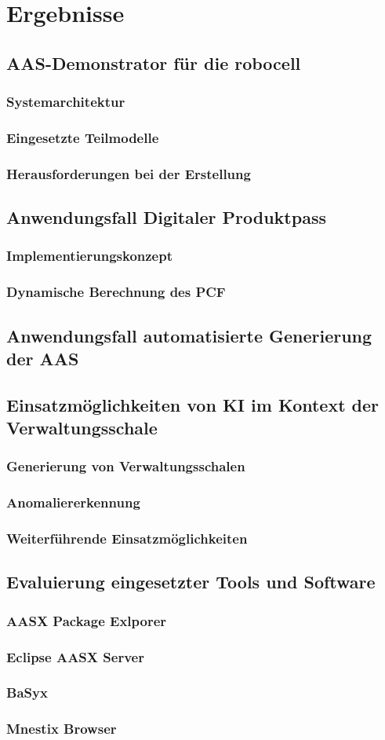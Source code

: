 \section{Ergebnisse}
\subsection{AAS-Demonstrator für die robocell}
\subsubsection{Systemarchitektur}
\subsubsection{Eingesetzte Teilmodelle}
\subsubsection{Herausforderungen bei der Erstellung}
\subsection{Anwendungsfall Digitaler Produktpass}
\subsubsection{Implementierungskonzept}
\subsubsection{Dynamische Berechnung des PCF}
\subsection{Anwendungsfall automatisierte Generierung der AAS}
\subsection{Einsatzmöglichkeiten von KI im Kontext der Verwaltungsschale}
\subsubsection{Generierung von Verwaltungsschalen}
\subsubsection{Anomaliererkennung}
\subsubsection{Weiterführende Einsatzmöglichkeiten}
\subsection{Evaluierung eingesetzter Tools und Software}
\subsubsection{AASX Package Exlporer}
\subsubsection{Eclipse AASX Server}
\subsubsection{BaSyx}
\subsubsection{Mnestix Browser}